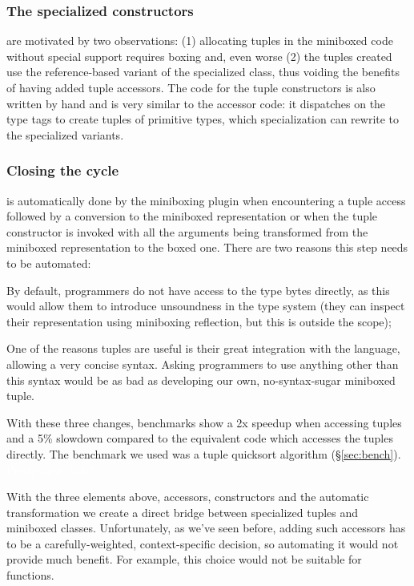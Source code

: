 \subsubsection{The specialized constructors} are motivated by two observations: (1) allocating tuples in the miniboxed code without special support requires boxing and, even worse (2) the tuples created use the reference-based variant of the specialized class, thus voiding the benefits of having added tuple accessors. The code for the tuple constructors is also written by hand and is very similar to the accessor code: it dispatches on the type tags to create tuples of primitive types, which specialization can rewrite to the specialized variants. 


\subsubsection{Closing the cycle} is automatically done by the miniboxing plugin when encountering a tuple access followed by a conversion to the miniboxed representation or when the tuple constructor is invoked with all the arguments being transformed from the miniboxed representation to the boxed one. There are two reasons this step needs to be automated:

\begin{compactitem}
 \item By default, programmers do not have access to the type bytes directly, as this would allow them to introduce unsoundness in the type system (they can inspect their representation using miniboxing reflection, but this is outside the scope);
 \item One of the reasons tuples are useful is their great integration with the language, allowing a very concise syntax. Asking programmers to use anything other than this syntax would be as bad as developing our own, no-syntax-sugar miniboxed tuple.
\end{compactitem}

With these three changes, benchmarks show a 2x speedup when accessing tuples and a 5\% slowdown compared to the equivalent code which accesses the tuples directly. The benchmark we used was a tuple quicksort algorithm (\S\ref{sec:bench}). \textcolor{white}{Pretty neat, huh?}

With the three elements above, accessors, constructors and the automatic transformation we create a direct bridge between specialized tuples and miniboxed classes. Unfortunately, as we've seen before, adding such accessors has to be a carefully-weighted, context-specific decision, so automating it would not provide much benefit. For example, this choice would not be suitable for functions.

